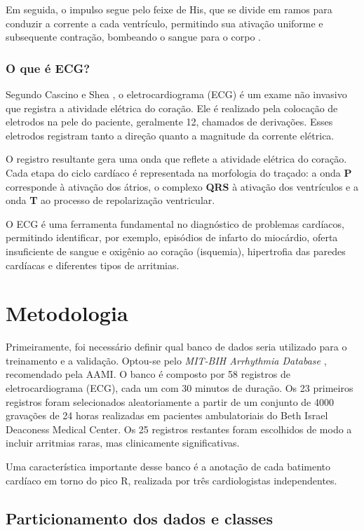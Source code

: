\documentclass[
    12pt,                %
    openright,           %
    oneside,             %
    a4paper,             %
    brazil               %
]{abntex2}
\begin{document}
Em seguida, o impulso segue pelo feixe de His, que se divide em ramos para conduzir a corrente a cada ventrículo, permitindo sua ativação uniforme e subsequente contração, bombeando o sangue para o corpo \cite{msd_ecg}.

\subsection{O que é ECG?}

Segundo Cascino e Shea \cite{msd_ecg}, o eletrocardiograma (ECG) é um exame não invasivo que registra a atividade elétrica do coração. 
Ele é realizado pela colocação de eletrodos na pele do paciente, geralmente 12, chamados de derivações. 
Esses eletrodos registram tanto a direção quanto a magnitude da corrente elétrica. 

O registro resultante gera uma onda que reflete a atividade elétrica do coração. 
Cada etapa do ciclo cardíaco é representada na morfologia do traçado: 
a onda \textbf{P} corresponde à ativação dos átrios, 
o complexo \textbf{QRS} à ativação dos ventrículos 
e a onda \textbf{T} ao processo de repolarização ventricular.  

O ECG é uma ferramenta fundamental no diagnóstico de problemas cardíacos, 
permitindo identificar, por exemplo, episódios de infarto do miocárdio, 
oferta insuficiente de sangue e oxigênio ao coração (isquemia), 
hipertrofia das paredes cardíacas e diferentes tipos de arritmias.

\chapter{Metodologia}

Primeiramente, foi necessário definir qual banco de dados seria utilizado para o treinamento e a validação. Optou-se pelo \textit{MIT-BIH Arrhythmia Database} \cite{mitbih2005}, recomendado pela AAMI. O banco é composto por 58 registros de eletrocardiograma (ECG), cada um com 30 minutos de duração. Os 23 primeiros registros foram selecionados aleatoriamente a partir de um conjunto de 4000 gravações de 24 horas realizadas em pacientes ambulatoriais do Beth Israel Deaconess Medical Center. Os 25 registros restantes foram escolhidos de modo a incluir arritmias raras, mas clinicamente significativas.

Uma característica importante desse banco é a anotação de cada batimento cardíaco em torno do pico R, realizada por três cardiologistas independentes.

\section{Particionamento dos dados e classes}
\label{sec:particionamento}
\end{document}
